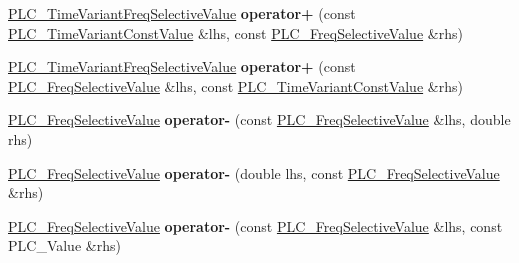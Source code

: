 \begin{DoxyCompactItemize}
\item 
\hypertarget{classns3_1_1PLC__FreqSelectiveValue_aa0651ee3ee605b4d029fcb89d93b5dd2}{\hyperlink{classns3_1_1PLC__TimeVariantFreqSelectiveValue}{\-P\-L\-C\-\_\-\-Time\-Variant\-Freq\-Selective\-Value} {\bfseries operator+} (const \hyperlink{classns3_1_1PLC__TimeVariantConstValue}{\-P\-L\-C\-\_\-\-Time\-Variant\-Const\-Value} \&lhs, const \hyperlink{classns3_1_1PLC__FreqSelectiveValue}{\-P\-L\-C\-\_\-\-Freq\-Selective\-Value} \&rhs)}\label{classns3_1_1PLC__FreqSelectiveValue_aa0651ee3ee605b4d029fcb89d93b5dd2}

\item 
\hypertarget{classns3_1_1PLC__FreqSelectiveValue_a2af198eff18574f291b5ecdbfd131851}{\hyperlink{classns3_1_1PLC__TimeVariantFreqSelectiveValue}{\-P\-L\-C\-\_\-\-Time\-Variant\-Freq\-Selective\-Value} {\bfseries operator+} (const \hyperlink{classns3_1_1PLC__FreqSelectiveValue}{\-P\-L\-C\-\_\-\-Freq\-Selective\-Value} \&lhs, const \hyperlink{classns3_1_1PLC__TimeVariantConstValue}{\-P\-L\-C\-\_\-\-Time\-Variant\-Const\-Value} \&rhs)}\label{classns3_1_1PLC__FreqSelectiveValue_a2af198eff18574f291b5ecdbfd131851}

\item 
\hypertarget{classns3_1_1PLC__FreqSelectiveValue_acbee783e36112983c1a8287dd8a924d3}{\hyperlink{classns3_1_1PLC__FreqSelectiveValue}{\-P\-L\-C\-\_\-\-Freq\-Selective\-Value} {\bfseries operator-\/} (const \hyperlink{classns3_1_1PLC__FreqSelectiveValue}{\-P\-L\-C\-\_\-\-Freq\-Selective\-Value} \&lhs, double rhs)}\label{classns3_1_1PLC__FreqSelectiveValue_acbee783e36112983c1a8287dd8a924d3}

\item 
\hypertarget{classns3_1_1PLC__FreqSelectiveValue_a28e904f0e6612efe8dd9932274aaf9f7}{\hyperlink{classns3_1_1PLC__FreqSelectiveValue}{\-P\-L\-C\-\_\-\-Freq\-Selective\-Value} {\bfseries operator-\/} (double lhs, const \hyperlink{classns3_1_1PLC__FreqSelectiveValue}{\-P\-L\-C\-\_\-\-Freq\-Selective\-Value} \&rhs)}\label{classns3_1_1PLC__FreqSelectiveValue_a28e904f0e6612efe8dd9932274aaf9f7}

\item 
\hypertarget{classns3_1_1PLC__FreqSelectiveValue_ad8a368feadd7e576d0318c9b48101907}{\hyperlink{classns3_1_1PLC__FreqSelectiveValue}{\-P\-L\-C\-\_\-\-Freq\-Selective\-Value} {\bfseries operator-\/} (const \hyperlink{classns3_1_1PLC__FreqSelectiveValue}{\-P\-L\-C\-\_\-\-Freq\-Selective\-Value} \&lhs, const \-P\-L\-C\-\_\-\-Value \&rhs)}\label{classns3_1_1PLC__FreqSelectiveValue_ad8a368feadd7e576d0318c9b48101907}


\end{DoxyCompactItemize}
